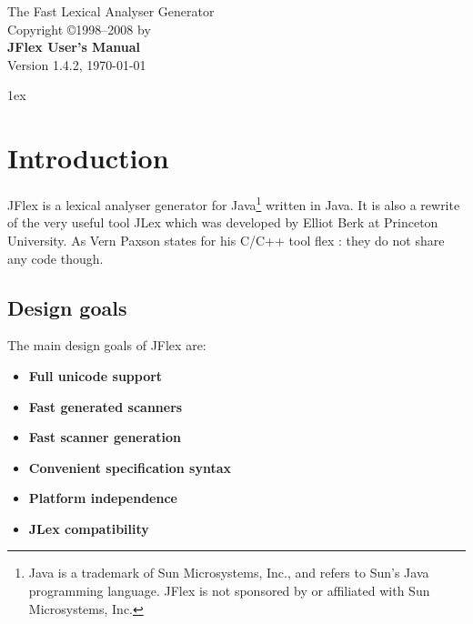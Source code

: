 \documentclass[11pt]{scrartcl}
\newcommand{\ver}{1.4.2}
\begin{document}


\begin{center}
\sffamily
{\Large The Fast Lexical Analyser Generator}\\
\smallskip\smallskip
Copyright \copyright 1998--2008 by \\
\bigskip
{\Huge \sffamily \bfseries JFlex User's Manual}\\
\bigskip
Version \ver, {\today}
\end{center}

\tableofcontents
\vfill
\newpage
\parindent0pt\parskip1ex
\pagestyle{headings}
\section{Introduction\label{Intro}}
JFlex is a lexical analyser generator for Java\footnote{Java is a trademark of 
Sun Microsystems, Inc., and refers to Sun's Java programming language. 
JFlex is not sponsored by or affiliated with Sun Microsystems, Inc.}
written in Java. It is also a rewrite of the very useful tool JLex \cite{JLex} which
was developed by Elliot Berk at Princeton University. As Vern Paxson states
for his C/C++ tool flex \cite{flex}: they do not share any code though.

\subsection{Design goals}
The main design goals of JFlex are:
\begin{itemize}
\item {\bf Full unicode support}
\item {\bf Fast generated scanners }
\item {\bf Fast scanner generation}
\item {\bf Convenient specification syntax}
\item {\bf Platform independence}
\item {\bf JLex compatibility}
\end{itemize}
\end{document}
